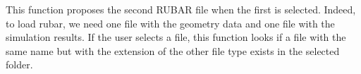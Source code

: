 \documentclass[letterpaper,10pt,english]{sphinxmanual}
\begin{document}
\begin{fulllineitems}
\begin{fulllineitems}
\label{\detokenize{index:src_GUI.hydro_GUI_2.Rubar2D.propose_next_file}}
This function proposes the second RUBAR file when the first is selected.  Indeed, to load rubar, we need
one file with the geometry data and one file with the simulation results. If the user selects a file, this
function looks if a file with the same name but with the extension of the other file type exists in the
selected folder.

\end{fulllineitems}


\end{fulllineitems}

\end{document}
